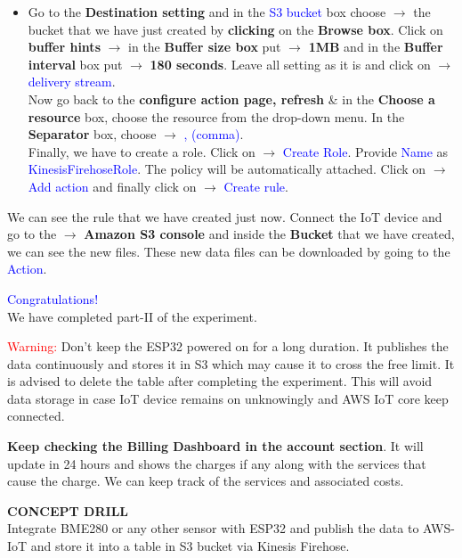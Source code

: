 \documentclass[12pt,a4paper]{article}
\begin{document}
\begin{justify}
\begin{itemize}
\item Go to the \textbf{Destination setting} and in the \textcolor{blue}{S3 bucket} box choose $ \rightarrow $ the bucket that we have just created by \textbf{clicking} on the \textbf{Browse box}. Click on \textbf{buffer hints} $ \rightarrow $ in the \textbf{Buffer size box} put $ \rightarrow $  \textbf{1MB} and in the \textbf{Buffer interval} box put $ \rightarrow $ \textbf{180 seconds}. Leave all setting as it is and click on $ \rightarrow $ \textcolor{blue}{delivery stream}.\\[4pt]
Now go back to the \textbf{configure action page, refresh} \& in the \textbf{Choose a resource} box, choose the  resource from the drop-down menu. In the \textbf{Separator} box, choose $ \rightarrow $ \textcolor{blue}{, (comma)}.\\[4pt]
Finally, we have to create a role. Click on $ \rightarrow $ \textcolor{blue}{Create Role}. Provide \textcolor{blue}{Name} as \textcolor{blue}{KinesisFirehoseRole}. The policy will be automatically attached. Click on $ \rightarrow $ \textcolor{blue}{Add action} and finally click on $ \rightarrow $ \textcolor{blue}{Create rule}.
\end{itemize}

\noindent We can see the rule that we have created just now. Connect the IoT device and go to the $ \rightarrow $  \textbf{Amazon S3 console} and inside the  \textbf{Bucket} that we have created, we can see the new files. These new data files can be downloaded by going to the \textcolor{blue}{Action}.

\begin{center}
\textcolor{blue}{Congratulations!}\\
We have completed part-II of the experiment.
\end{center}

\noindent \textcolor{red}{Warning:} Don't keep the ESP32 powered on for a long duration. It publishes the data continuously and stores it in S3 which may cause it to cross the free limit. It is advised to delete the table after completing the experiment. This will avoid data storage in case IoT device remains on unknowingly and AWS IoT core keep connected.\par
\noindent\textbf{Keep checking the Billing Dashboard in the account section}. It will update in 24 hours and shows the charges if any along with the services that cause the charge. We can keep track of the services and associated costs. 

\noindent \textbf{\large CONCEPT DRILL}\\[6pt]
Integrate BME280 or any other sensor with ESP32 and publish the data to AWS-IoT and store it into a table in S3 bucket via Kinesis Firehose.



\end{justify}
\end{document}
